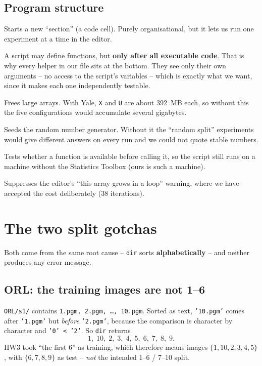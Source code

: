 \documentclass[11pt]{article}
\theoremstyle{definition}
\theoremstyle{remark}
\begin{document}
\subsection{Program structure}

\begin{description}[leftmargin=*,style=nextline]
\item[\texttt{\%\%}] Starts a new ``section'' (a code cell). Purely organisational,
  but it lets us run one experiment at a time in the editor.
\item[Local functions] A script may define functions, but \textbf{only after all
  executable code}. That is why every helper in our file sits at the bottom. They
  see only their own arguments -- no access to the script's variables -- which is
  exactly what we want, since it makes each one independently testable.
\item[\texttt{clear U A Ate Xtr Xte;}] Frees large arrays. With Yale, \texttt{X} and
  \texttt{U} are about 392~MB each, so without this the five configurations would
  accumulate several gigabytes.
\item[\texttt{rng(0)}] Seeds the random number generator. Without it the ``random
  split'' experiments would give different answers on every run and we could not
  quote stable numbers.
\item[\texttt{exist('fitcdiscr','file') == 2}] Tests whether a function is
  available before calling it, so the script still runs on a machine without the
  Statistics Toolbox (ours is such a machine).
\item[\texttt{\%\#ok<SAGROW>}] Suppresses the editor's ``this array grows in a
  loop'' warning, where we have accepted the cost deliberately (38 iterations).
\end{description}

\section{The two split gotchas}
\label{sec:splitgotchas}

Both come from the same root cause -- \texttt{dir} sorts \textbf{alphabetically} --
and neither produces any error message.

\subsection{ORL: the training images are not 1--6}

\texttt{ORL/s1/} contains \texttt{1.pgm, 2.pgm, \ldots, 10.pgm}. Sorted as text,
\texttt{'10.pgm'} comes after \texttt{'1.pgm'} but \emph{before} \texttt{'2.pgm'},
because the comparison is character by character and \texttt{'0' < '2'}. So
\texttt{dir} returns
\[
  1,\;10,\;2,\;3,\;4,\;5,\;6,\;7,\;8,\;9 .
\]
HW3 took ``the first 6'' as training, which therefore means images
$\{1,10,2,3,4,5\}$, with $\{6,7,8,9\}$ as test -- \emph{not} the intended 1--6 /
7--10 split.
\end{document}
